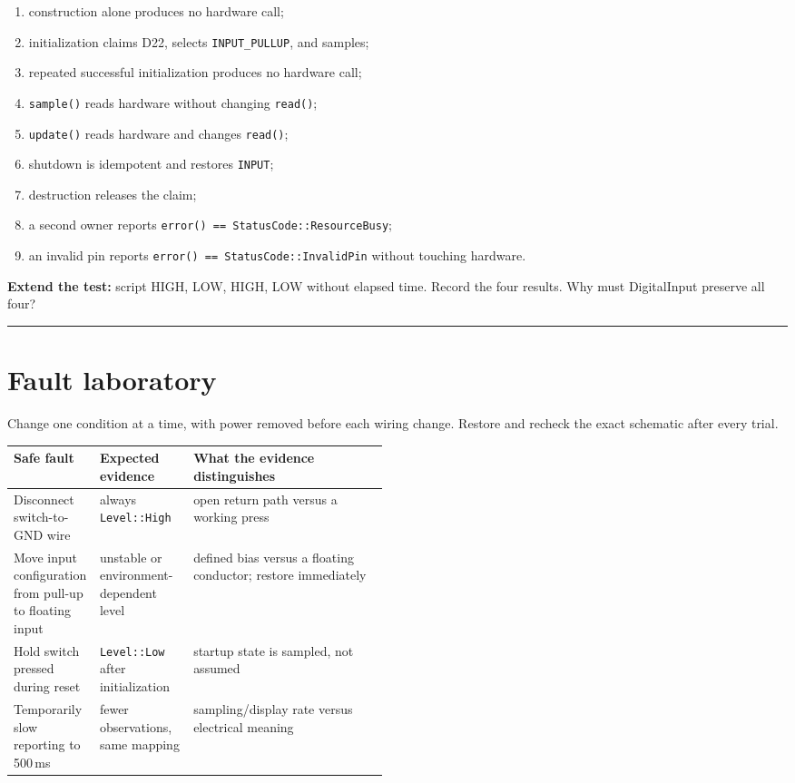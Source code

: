 \documentclass[11pt]{article}
\newcommand{\blank}[1]{\rule{#1}{0.4pt}}
\begin{document}
\begin{enumerate}
    \item construction alone produces no hardware call;
    \item initialization claims D22, selects \texttt{INPUT\_PULLUP}, and samples;
    \item repeated successful initialization produces no hardware call;
    \item \texttt{sample()} reads hardware without changing \texttt{read()};
    \item \texttt{update()} reads hardware and changes \texttt{read()};
    \item shutdown is idempotent and restores \texttt{INPUT};
    \item destruction releases the claim;
    \item a second owner reports
          \texttt{error() == StatusCode::ResourceBusy};
    \item an invalid pin reports
          \texttt{error() == StatusCode::InvalidPin} without touching hardware.
\end{enumerate}

\textbf{Extend the test:} script HIGH, LOW, HIGH, LOW without elapsed time. Record
the four results. Why must DigitalInput preserve all four?\\[8pt]
\blank{6.8in}

\section{Fault laboratory}

Change one condition at a time, with power removed before each wiring change.
Restore and recheck the exact schematic after every trial.

\begin{tabularx}{\linewidth}{@{}p{0.23\linewidth}p{0.25\linewidth}X@{}}
\toprule
Safe fault & Expected evidence & What the evidence distinguishes\\
\midrule
Disconnect switch-to-GND wire
& always \texttt{Level::High}
& open return path versus a working press\\
Move input configuration from pull-up to floating input
& unstable or environment-dependent level
& defined bias versus a floating conductor; restore immediately\\
Hold switch pressed during reset
& \texttt{Level::Low} after initialization
& startup state is sampled, not assumed\\
Temporarily slow reporting to 500\,ms
& fewer observations, same mapping
& sampling/display rate versus electrical meaning\\
\bottomrule
\end{tabularx}
\end{document}
